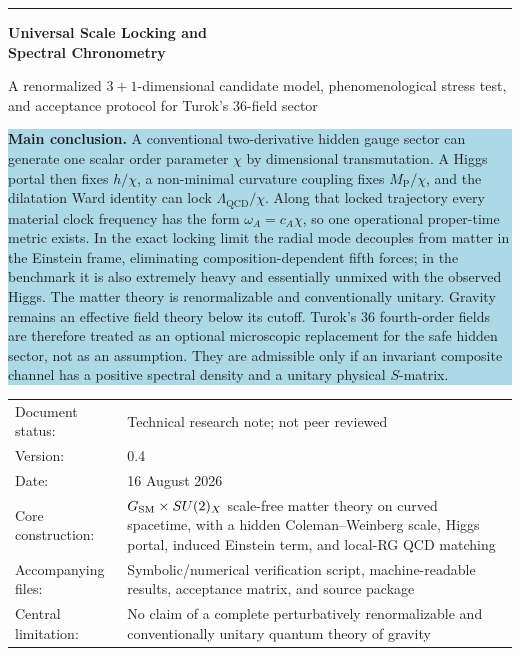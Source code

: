 \documentclass[11pt,a4paper]{article}
\newcommand{\MP}{M_{\mathrm P}}
\newcommand{\QCD}{\mathrm{QCD}}
\begin{document}

\begin{titlepage}
\thispagestyle{empty}
\vspace*{8mm}

{\color{navy}\rule{\textwidth}{1.2pt}}
\vspace{7mm}

{\fontsize{21}{25}\selectfont\bfseries\color{navy} Universal Scale Locking and\\ Spectral Chronometry\par}
\vspace{3mm}
{\Large A renormalized $3+1$-dimensional candidate model, phenomenological stress test, and acceptance protocol for Turok's 36-field sector\par}

\vspace{9mm}

\begin{center}
\begin{minipage}{0.93\textwidth}
\colorbox{lightblue}{\parbox{0.96\textwidth}{
\textbf{Main conclusion.} A conventional two-derivative hidden gauge sector can generate one scalar order parameter $\chi$ by dimensional transmutation. A Higgs portal then fixes $h/\chi$, a non-minimal curvature coupling fixes $\MP/\chi$, and the dilatation Ward identity can lock $\Lambda_{\QCD}/\chi$. Along that locked trajectory every material clock frequency has the form $\omega_A=c_A\chi$, so one operational proper-time metric exists. In the exact locking limit the radial mode decouples from matter in the Einstein frame, eliminating composition-dependent fifth forces; in the benchmark it is also extremely heavy and essentially unmixed with the observed Higgs. The matter theory is renormalizable and conventionally unitary. Gravity remains an effective field theory below its cutoff. Turok's 36 fourth-order fields are therefore treated as an optional microscopic replacement for the safe hidden sector, not as an assumption. They are admissible only if an invariant composite channel has a positive spectral density and a unitary physical $S$-matrix.
}}
\end{minipage}
\end{center}

\vfill

\begin{tabularx}{\textwidth}{@{}p{}X@{}}
Document status: & Technical research note; not peer reviewed \\
Version: & 0.4 \\
Date: & 16 August 2026 \\
Core construction: & $G_{\rm SM}\times SU(2)_X$ scale-free matter theory on curved spacetime, with a hidden Coleman--Weinberg scale, Higgs portal, induced Einstein term, and local-RG QCD matching \\
Accompanying files: & Symbolic/numerical verification script, machine-readable results, acceptance matrix, and source package \\
Central limitation: & No claim of a complete perturbatively renormalizable and conventionally unitary quantum theory of gravity
\end{tabularx}


\end{titlepage}
\end{document}
